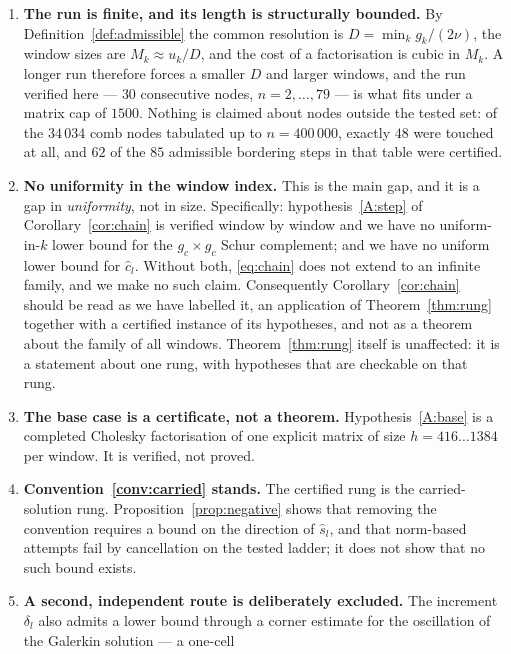 \documentclass[11pt,a4paper]{article}
\theoremstyle{plain}
\theoremstyle{definition}
\newcommand{\shat}{\widehat{s}}
\begin{document}
\begin{enumerate}[label=\textup{(L\arabic*)},leftmargin=3.2em]
\item\label{L:finite} \textbf{The run is finite, and its length is structurally
  bounded.} By Definition~\ref{def:admissible} the common resolution is
  $D=\min_{k}g_{k}/(2\nu)$, the window sizes are $M_{k}\approx u_{k}/D$, and the cost
  of a factorisation is cubic in $M_{k}$. A longer run therefore forces a smaller $D$
  and larger windows, and the run verified here --- $30$ consecutive nodes,
  $n=2,\dots,79$ --- is what fits under a matrix cap of $1500$. Nothing is claimed
  about nodes outside the tested set: of the $34\,034$ comb nodes tabulated up to
  $n=400\,000$, exactly $48$ were touched at all, and $62$ of the $85$ admissible
  bordering steps in that table were certified.
\item\label{L:uniform} \textbf{No uniformity in the window index.} This is the main
  gap, and it is a gap in \emph{uniformity}, not in size. Specifically:
  hypothesis~\ref{A:step} of Corollary~\ref{cor:chain} is verified window by window
  and we have no uniform-in-$k$ lower bound for the $g_{c}\times g_{c}$ Schur
  complement; and we have no uniform lower bound for $\widehat c_{l}$. Without both,
  \eqref{eq:chain} does not extend to an infinite family, and we make no such claim.
  Consequently Corollary~\ref{cor:chain} should be read as we have labelled it, an
  application of Theorem~\ref{thm:rung} together with a certified instance of its
  hypotheses, and not as a theorem about the family of all windows.
  Theorem~\ref{thm:rung} itself is unaffected: it is a statement about one rung, with
  hypotheses that are checkable on that rung.
\item\label{L:base} \textbf{The base case is a certificate, not a theorem.}
  Hypothesis~\ref{A:base} is a completed Cholesky factorisation of one explicit
  matrix of size $h=416\dots1384$ per window. It is verified, not proved.
\item\label{L:conv} \textbf{Convention~\ref{conv:carried} stands.} The certified rung
  is the carried-solution rung. Proposition~\ref{prop:negative} shows that removing
  the convention requires a bound on the direction of $\shat_{l}$, and that
  norm-based attempts fail by cancellation on the tested ladder; it does not show
  that no such bound exists.
\item\label{L:secondroute} \textbf{A second, independent route is deliberately
  excluded.} The increment $\delta_{l}$ also admits a lower bound through a
  corner estimate for the oscillation of the Galerkin solution --- a one-cell

\end{enumerate}
\end{document}
